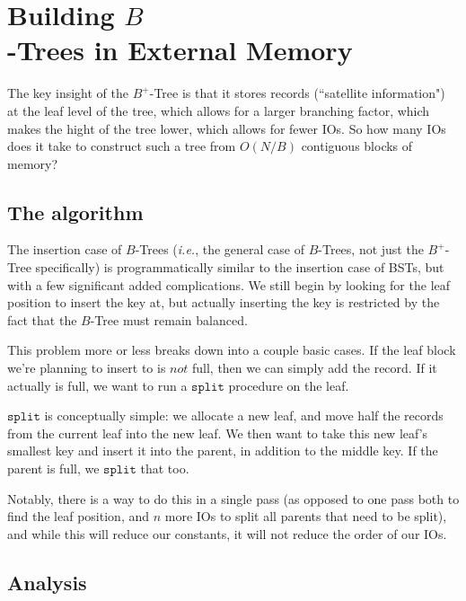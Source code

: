 \documentclass[fleqn]{article}
\begin{document}


\section{Building $B$\\
-Trees in External Memory	}

The key insight of the $B^{+}$-Tree is that it stores records (``satellite information") at the leaf level of the tree, which allows for a larger branching factor, which makes the hight of the tree lower, which allows for fewer IOs. So how many IOs does it take to construct such a tree from $O(N/B)$ contiguous blocks of memory?

\subsection{The algorithm}

The insertion case of $B$-Trees (\textit{i.e.}, the general case of $B$-Trees, not just the $B^+$-Tree specifically) is programmatically similar to the insertion case of BSTs, but with a few significant added complications. We still begin by looking for the leaf position to insert the key at, but actually inserting the key is restricted by the fact that the $B$-Tree must remain balanced.

This problem more or less breaks down into a couple basic cases. If the leaf block we're planning to insert to is $\textit{not}$ full, then we can simply add the record. If it actually is full, we want to run a $\texttt{split}$ procedure on the leaf.

$\texttt{split}$ is conceptually simple: we allocate a new leaf, and move half the records from the current leaf into the new leaf. We then want to take this new leaf's smallest key and insert it into the parent, in addition to the middle key. If the parent is full, we $\texttt{split}$ that too.

Notably, there is a way to do this in a single pass (as opposed to one pass both to find the leaf position, and $n$ more IOs to split all parents that need to be split), and while this will reduce our constants, it will not reduce the order of our IOs.

\subsection{Analysis}
\end{document}
